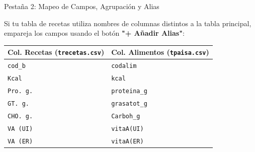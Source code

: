 \documentclass[11pt,a4paper]{article}
\begin{document}
\begin{stepcard}{Pestaña 2: Mapeo de Campos, Agrupación y Alias}
\begin{glassbox}
Si tu tabla de recetas utiliza nombres de columnas distintos a la tabla principal, empareja los campos usando el botón \textbf{"+ Añadir Alias"}:
\begin{center}
\begin{tabular}{@{}ll@{}}
\toprule
\textbf{Col. Recetas (\texttt{trecetas.csv})} & \textbf{Col. Alimentos (\texttt{tpaisa.csv})} \\
\midrule
\texttt{cod\_b} & \texttt{codalim} \\
\texttt{Kcal} & \texttt{kcal} \\
\texttt{Pro. g.} & \texttt{proteina\_g} \\
\texttt{GT. g.} & \texttt{grasatot\_g} \\
\texttt{CHO. g.} & \texttt{Carboh\_g} \\
\texttt{VA (UI)} & \texttt{vitaA(UI)} \\
\texttt{VA (ER)} & \texttt{vitaA(ER)} \\
\bottomrule
\end{tabular}
\end{center}
\end{glassbox}
\end{stepcard}

\vspace{0.4cm}
\end{document}
